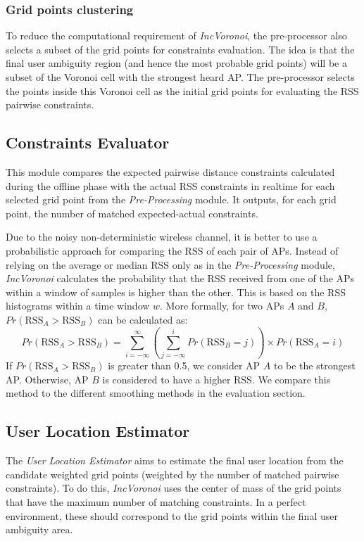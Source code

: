 \documentclass[conference]{IEEEtran}
\def \sys {\textit{IncVoronoi}}
\begin{document}
\subsubsection{Grid points clustering}
To reduce the computational requirement of \sys{}, the pre-processor also selects a subset of the grid points for constraints evaluation. The idea is that the final user ambiguity region (and hence the most probable grid points) will be a subset of the Voronoi cell with the strongest heard AP. The pre-processor selects the points inside this Voronoi cell as the initial grid points for evaluating the RSS pairwise constraints. 

\subsection{Constraints Evaluator}
This module compares the expected pairwise distance constraints calculated during the offline phase with the actual RSS constraints in realtime for each selected grid point from the \emph{Pre-Processing} module. It outputs, for each grid point, the number of matched expected-actual constraints. 

Due to the noisy non-deterministic wireless channel, it is better to use a probabilistic approach for comparing the RSS of each pair of APs. Instead of relying on the average or median RSS only as in the \emph{Pre-Processing} module, \sys{} calculates the probability that the RSS received from one of the APs within a window of samples is higher than the other. This is based on the RSS histograms within a time window $w$. More formally, for two APs $A$ and $B$, $Pr(\textrm{RSS}_A>\textrm{RSS}_B)$ can be calculated as:
\begin{equation}
\label{eq:probMethodx}
Pr(\textrm{RSS}_A>\textrm{RSS}_B)=\sum\limits_{i=-\infty}^\infty (\sum\limits_{j=-\infty}^i Pr(\textrm{RSS}_B=j))\times Pr(\textrm{RSS}_A=i)
\end{equation}
If $Pr(\textrm{RSS}_A>\textrm{RSS}_B)$ is greater than 0.5, we consider AP $A$ to be the strongest AP. Otherwise, AP $B$ is considered to have a higher RSS. We compare this method to the different smoothing methods in the evaluation section.
\subsection{User Location Estimator}\label{sec:locest}
The \emph{User Location Estimator} aims to estimate the final user location from the candidate weighted grid points (weighted by the number of matched pairwise constraints). To do this, \sys{} uses the center of mass of the grid points that have the maximum number of matching constraints. In a perfect environment, these should correspond to the grid points within the final user ambiguity area.
\end{document}
